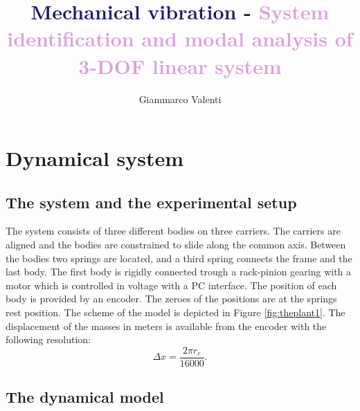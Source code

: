 \documentclass[twosided,a4paper]{article}           %
\begin{document}
	
	\title{\textcolor{MidnightBlue}{Mechanical vibration} - \textcolor{Plum}{System identification and modal analysis of 3-DOF linear system}}
	\author{Giammarco Valenti}
	\maketitle
	
\section{Dynamical system}
\subsection{The system and the experimental setup}
The system consists of three different bodies on three carriers. The carriers are aligned and the bodies are constrained to slide along the common axis. Between the bodies two springs are located, and a third spring connects the frame and the last body. The first body is rigidly connected trough a rack-pinion gearing with a motor which is controlled in voltage with a PC interface. The position of each body is provided by an encoder. The zeroes of the positions are at the springs rest position. The scheme of the model is depicted in Figure \ref{fig:theplant1}.
The displacement of the masses in meters is available from the encoder with the following resolution:
\begin{equation}
	\Delta x = \dfrac{2 \pi r_e}{16000}.
	\label{eq:enc_res}
\end{equation}
\subsection{The dynamical model}
\end{document}

